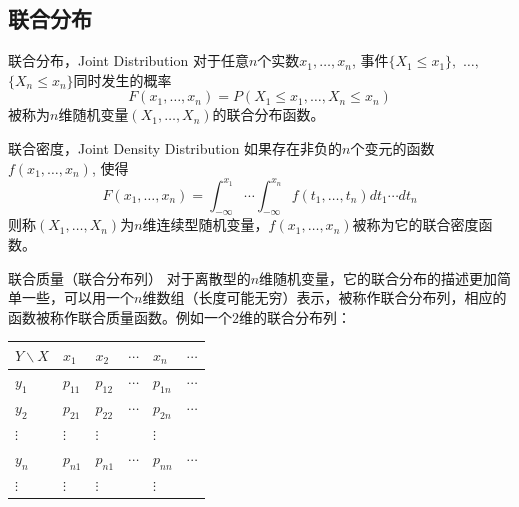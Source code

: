 
\subsection{联合分布}


\begin{frame}

\begin{block}{联合分布，Joint Distribution}
对于任意$n$个实数$x_1, \ldots, x_n$, 事件$\{X_1 \le x_1\},$ $\ldots,$ $\{X_n \le x_n\}$同时发生的概率
$$F(x_1,\ldots,x_n) = P(X_1 \le x_1, \ldots, X_n \le x_n)$$
被称为$n$维随机变量$(X_1, \ldots, X_n)$的联合分布函数。
\end{block}

\begin{block}{联合密度，Joint Density Distribution}
如果存在非负的$n$个变元的函数$f(x_1,\ldots,x_n)$, 使得
$$F(x_1,\ldots,x_n) = \int_{-\infty}^{x_1} \cdots \int_{-\infty}^{x_n} f(t_1,\ldots,t_n) dt_1 \cdots dt_n$$
则称$(X_1, \ldots, X_n)$为$n$维连续型随机变量，$f(x_1,\ldots,x_n)$被称为它的联合密度函数。
\end{block}

\end{frame}


\begin{frame}

\begin{block}{联合质量（联合分布列）}
对于离散型的$n$维随机变量，它的联合分布的描述更加简单一些，可以用一个$n$维数组（长度可能无穷）表示，被称作联合分布列，相应的函数被称作联合质量函数。例如一个$2$维的联合分布列：
\begin{center}
\renewcommand{\arraystretch}{1.5}
\begin{tabu} to 0.8\textwidth { X[c] | X[c] | X[c] | X[c] | X[c] | X[c] }
\hline
$Y \backslash X$ & $x_1$ & $x_2$ & $\cdots$ & $x_n$ & $\cdots$ \\
\hline
$y_1$ & $p_{11}$ & $p_{12}$ & $\cdots$ & $p_{1n}$ & $\cdots$ \\
\hline
$y_2$ & $p_{21}$ & $p_{22}$ & $\cdots$ & $p_{2n}$ & $\cdots$ \\
\hline
$\vdots$ & $\vdots$ & $\vdots$ &  & $\vdots$ &  \\
\hline
$y_n$ & $p_{n1}$ & $p_{n1}$ & $\cdots$ & $p_{nn}$ & $\cdots$ \\
\hline
$\vdots$ & $\vdots$ & $\vdots$ &  & $\vdots$ &  \\
\end{tabu}
\renewcommand{\arraystretch}{1}
\end{center}
\end{block}

\end{frame}

